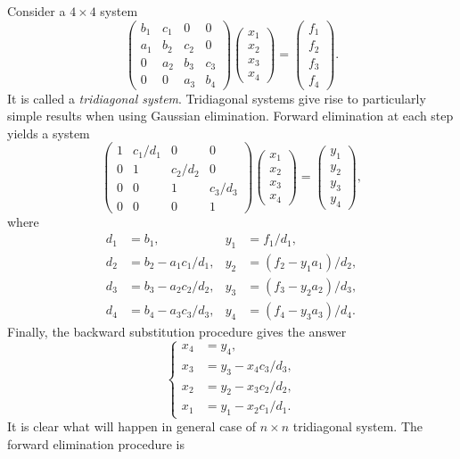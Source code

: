 \noindent Consider a $4\times 4$ system
%
\begin{equation*}
  \begin{pmatrix}
    b_1 & c_1 & 0 & 0 \\
    a_1 & b_2 & c_2 & 0 \\
    0 & a_2 & b_3 & c_3 \\
    0 & 0 & a_3 & b_4
  \end{pmatrix}
  \begin{pmatrix}
    x_1 \\ x_2 \\ x_3 \\ x_4
  \end{pmatrix}
  =
  \begin{pmatrix}
    f_1 \\ f_2\\ f_3 \\ f_4
  \end{pmatrix}.
\end{equation*}
%
It is called a \textit{tridiagonal system}. Tridiagonal systems give
rise to particularly simple results when using Gaussian elimination.
Forward elimination at each step yields a system
%
\begin{equation*}
  \begin{pmatrix}
    1 & c_1/d_1 & 0 & 0 \\
    0 & 1 & c_2/d_2 & 0 \\
    0 & 0 & 1 & c_3/d_3 \\
    0 & 0 & 0 & 1
  \end{pmatrix}
  \begin{pmatrix}
    x_1 \\ x_2 \\ x_3 \\ x_4
  \end{pmatrix}
  =
  \begin{pmatrix}
    y_1 \\ y_2\\ y_3 \\ y_4
  \end{pmatrix},
\end{equation*}
%
where
%
\begin{align*}
    d_1 &= b_1, & y_1 &= f_1/d_1, \\
    d_2 &= b_2-a_1c_1/d_1, & y_2 &= (f_2-y_1 a_1)/d_2, \\
    d_3 &= b_3-a_2c_2/d_2, & y_3 &= (f_3-y_2 a_2)/d_3, \\
    d_4 &= b_4-a_3c_3/d_3, & y_4 &= (f_4-y_3 a_3)/d_4.
\end{align*}
%
Finally, the backward substitution procedure gives the answer
%
\begin{equation*}
  \left\{
    \begin{aligned}
      x_4 &= y_4,\\
      x_3 &= y_3-x_4 c_3/d_3,\\
      x_2 &= y_2-x_3 c_2/d_2,\\
      x_1 &= y_1-x_2 c_1/d_1.
    \end{aligned} \right .
\end{equation*}
%
It is clear what will happen in general case of $n\times n$
tridiagonal system.  The forward elimination procedure is


